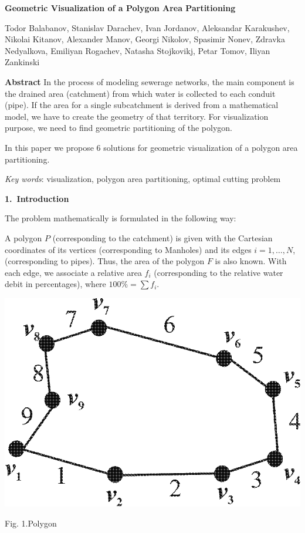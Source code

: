 \documentclass[11pt,leqno]{book}
\newcommand{\sect}[1]{\vskip7mm\par{\large \bf #1}}
\begin{document}
%
\begin{center}
\textbf{\LARGE Geometric Visualization of a Polygon Area Partitioning}

\vspace*{5mm}
%
Todor Balabanov,
Stanislav Darachev,
Ivan Jordanov,
Aleksandar Karakushev,
Nikolai Kitanov,
Alexander Manov,
Georgi Nikolov,
Spasimir Nonev,
Zdravka Nedyalkova,
Emiliyan Rogachev,
Natasha Stojkovikj,
Petar Tomov,
Iliyan Zankinski
%
\end{center}
%
\date{18-22 Sep 2017}
%
\sect{Abstract}
%
In the process of modeling sewerage networks, the main component is the drained area (catchment) from which water is collected to each conduit (pipe). If the area for a single subcatchment is derived from a mathematical model, we have to create the geometry of that territory. For visualization purpose, we need to find geometric partitioning of the polygon.

In this paper we propose 6 solutions for geometric visualization of a polygon area partitioning.

\textit{Key words}: visualization, polygon area partitioning, optimal cutting problem

\sect{1.~Introduction}

The problem  mathematically is formulated in the following way:

A polygon $P$ (corresponding to the catchment) is given with the Cartesian coordinates of its vertices (corresponding to Manholes) and its edges $i= 1, \ldots, N$, (corresponding to pipes). Thus, the area of the polygon $F$ is also known. With each edge, we associate a relative area $f_i$ (corresponding to the relative water debit in percentages), where  $100\% = \sum f_i$.

\begin{center}
\includegraphics  {pic01.png}

Fig. 1.Polygon
\label{fig1}
\end{center}
\end{document}
